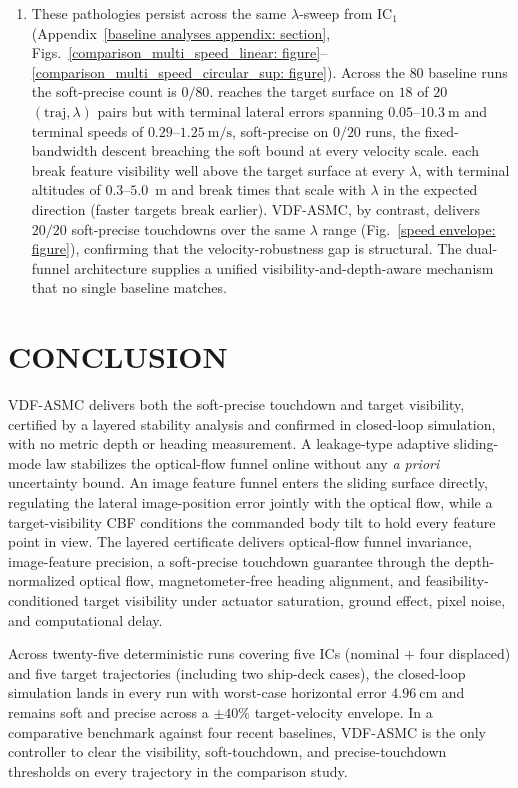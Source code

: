 \documentclass{IEEEtaes}
\begin{document}
\begin{enumerate}
    \item These pathologies persist across the same $\lambda$-sweep from IC$_1$ (Appendix~\ref{baseline analyses appendix: section}, Figs.~\ref{comparison_multi_speed_linear: figure}--\ref{comparison_multi_speed_circular_sup: figure}). Across the $80$ baseline runs the soft-precise count is $0/80$. \cite{zhang2026} reaches the target surface on $18$ of $20$ $(\text{traj},\lambda)$ pairs but with terminal lateral errors spanning $0.05$--$10.3~\text{m}$ and terminal speeds of $0.29$--$1.25~\text{m/s}$, soft-precise on $0/20$ runs, the fixed-bandwidth descent breaching the soft bound at every velocity scale. \cite{lin2022,lin2023,cho2022} each break feature visibility well above the target surface at every $\lambda$, with terminal altitudes of $0.3$--$5.0$~m and break times that scale with $\lambda$ in the expected direction (faster targets break earlier). VDF-ASMC, by contrast, delivers $20/20$ soft-precise touchdowns over the same $\lambda$ range (Fig.~\ref{speed envelope: figure}), confirming that the velocity-robustness gap is structural. The dual-funnel architecture supplies a unified visibility-and-depth-aware mechanism that no single baseline matches.
\end{enumerate}

\section{CONCLUSION}
\label{conclusion: section}
VDF-ASMC delivers both the soft-precise touchdown and target visibility, certified by a layered stability analysis and confirmed in closed-loop simulation, with no metric depth or heading measurement. A leakage-type adaptive sliding-mode law stabilizes the optical-flow funnel online without any \emph{a priori} uncertainty bound. An image feature funnel enters the sliding surface directly, regulating the lateral image-position error jointly with the optical flow, while a target-visibility CBF conditions the commanded body tilt to hold every feature point in view. The layered certificate delivers optical-flow funnel invariance, image-feature precision, a soft-precise touchdown guarantee through the depth-normalized optical flow, magnetometer-free heading alignment, and feasibility-conditioned target visibility under actuator saturation, ground effect, pixel noise, and computational delay.

Across twenty-five deterministic runs covering five ICs (nominal $+$ four displaced) and five target trajectories (including two ship-deck cases), the closed-loop simulation lands in every run with worst-case horizontal error $4.96~\text{cm}$ and remains soft and precise across a $\pm 40\%$ target-velocity envelope. In a comparative benchmark against four recent baselines, VDF-ASMC is the only controller to clear the visibility, soft-touchdown, and precise-touchdown thresholds on every trajectory in the comparison study.
\end{document}

